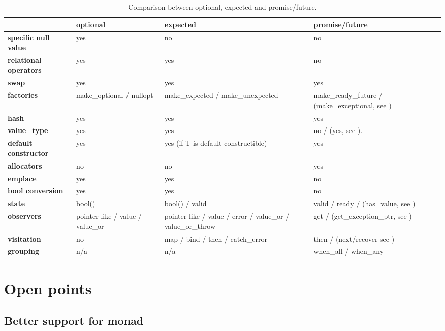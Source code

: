 \documentclass[a4paper,10pt]{article}
\begin{document}
\begin{table}
\bgroup
\def\arraystretch{1.5}
\begin{tabular}{|l|>{\raggedright\arraybackslash}p{4cm}|>{\raggedright\arraybackslash}p{4cm}|>{\raggedright\arraybackslash}p{4cm}|}
\hline
                    & \textbf{optional} & \textbf{expected} & \textbf{promise/future} \\
\hline
\textbf{specific null value} & yes & no & no \\
\hline
\textbf{relational operators} & yes & yes & no \\
\hline
\textbf{swap} & yes & yes & yes \\
\hline
\textbf{factories} & make_optional / nullopt & make_expected / make_unexpected & make_ready_future / (make_exceptional, see \cite{MoreAsync}) \\
\hline
\textbf{hash} & yes & yes & yes \\
\hline
\textbf{value_type} & yes & yes & no / (yes, see \cite{MoreAsync}).  \\
\hline
\textbf{default constructor} & yes & yes (if T is default constructible) & yes \\
\hline
\textbf{allocators} & no & no & yes \\
\hline
\textbf{emplace} & yes & yes & no \\
\hline
\textbf{bool conversion} & yes & yes & no \\
\hline
\textbf{state} & bool()  &  bool() / valid & valid / ready / (has_value, see \cite{MoreAsync}) \\
\hline
\textbf{observers} & pointer-like / value / value_or & pointer-like / value / error / value_or / value_or_throw & get / (get_exception_ptr, see \cite{MoreAsync}) \\
\hline
\textbf{visitation} & no & map / bind / then / catch_error  & then / (next/recover see \cite{MoreAsync}) \\
\hline
\textbf{grouping} & n/a & n/a & when_all / when_any \\
\hline
\end{tabular}
\egroup
\caption{Comparison between optional, expected and promise/future.}
\label{comp-monads}
\end{table}

\section{Open points}

\subsection{Better support for monad}
\label{better-support-for-monad}
\end{document}
